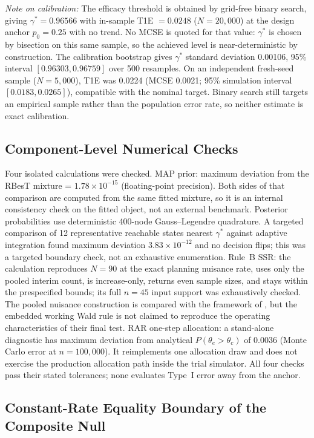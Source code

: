 \documentclass[11pt]{article}
\begin{document}
\textit{Note on calibration:} The efficacy threshold is obtained by grid-free
binary search, giving $\gamma^* = 0.96566$ with in-sample T1E $= 0.0248$
($N = 20{,}000$) at the design anchor $p_0 = 0.25$ with no trend.  No MCSE is
quoted for that value: $\gamma^*$ is chosen by bisection on this same sample,
so the achieved level is near-deterministic by construction.  The calibration
bootstrap gives $\gamma^*$ standard deviation 0.00106, 95\% interval
$[0.96303, 0.96759]$ over 500 resamples.
On an independent fresh-seed sample ($N=5{,}000$), T1E was 0.0224 (MCSE
0.0021; 95\% simulation interval $[0.0183,0.0265]$), compatible with the
nominal target.  Binary search still targets an empirical sample rather than
the population error rate, so neither estimate is exact calibration.


\subsection{Component-Level Numerical Checks}

Four isolated calculations were checked.  MAP prior: maximum deviation from
the RBesT mixture = $1.78 \times 10^{-15}$ (floating-point precision).  Both
sides of that comparison are computed from the same fitted mixture, so it is an
internal consistency check on the fitted object, not an external benchmark.
Posterior probabilities use deterministic 400-node Gauss--Legendre quadrature.
A targeted comparison of 12 representative reachable states nearest
$\gamma^*$ against adaptive integration found maximum deviation
$3.83\times10^{-12}$ and no decision flips; this was a targeted boundary check,
not an exhaustive enumeration.
Rule~B SSR: the calculation reproduces $N=90$ at the exact planning nuisance
rate, uses only the pooled interim count, is increase-only, returns even sample
sizes, and stays within the prespecified bounds; its full $n=45$ input support
was exhaustively checked.  The pooled nuisance construction is compared with
the framework of \citet{friede_kieser_2004}, but the embedded working Wald rule
is not claimed to reproduce the operating characteristics of their final test.
RAR one-step allocation: a stand-alone diagnostic has maximum deviation from
analytical $P(\theta_e > \theta_c)$ of 0.0036 (Monte Carlo error at
$n = 100{,}000$).  It reimplements one allocation draw and does not exercise
the production allocation path inside the trial simulator.  All four checks
pass their stated tolerances; none evaluates Type~I error away from the anchor.

\subsection{Constant-Rate Equality Boundary of the Composite Null}
\label{sec:constant-rate}
\end{document}
